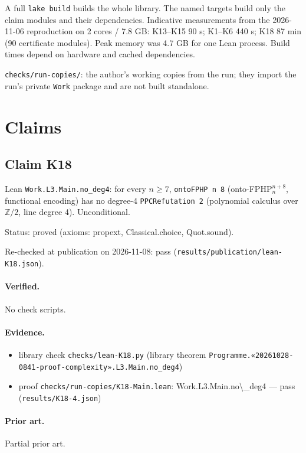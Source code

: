 \documentclass{article}
\begin{document}
A full \texttt{lake build} builds the whole library. The named targets build only the claim modules and their dependencies. Indicative measurements from the 2026-11-06 reproduction on 2 cores / 7.8 GB: K13--K15 90 s; K1--K6 440 s; K18 87 min (90 certificate modules). Peak memory was 4.7 GB for one Lean process. Build times depend on hardware and cached dependencies.

\texttt{checks/run-copies/}: the author's working copies from the run; they import the run's private \texttt{Work} package and are not built standalone.

\section{Claims}

\subsection*{Claim K18}

Lean \texttt{Work.L3.Main.no\_deg4}: for every $n\ge7$, \texttt{ontoFPHP n 8} (onto-FPHP$^{n+8}_n$, functional encoding) has no degree-4 \texttt{PPCRefutation 2} (polynomial calculus over $\mathbb Z/2$, line degree 4). Unconditional.

Status: proved (axioms: propext, Classical.choice, Quot.sound).

Re-checked at publication on 2026-11-08: pass (\texttt{results/publication/lean-K18.json}).

\paragraph{Verified.}
No check scripts.

\paragraph{Evidence.}
\begin{itemize}
\item library check \texttt{checks/lean-K18.py} (library theorem \texttt{Programme.«20261028-0841-proof-complexity».L3.Main.no\_deg4})
\item proof \texttt{checks/run-copies/K18-Main.lean}: Work.L3.Main.no\textbackslash{}\_deg4 --- pass (\texttt{results/K18-4.json})
\end{itemize}

\paragraph{Prior art.} Partial prior art.
\end{document}
